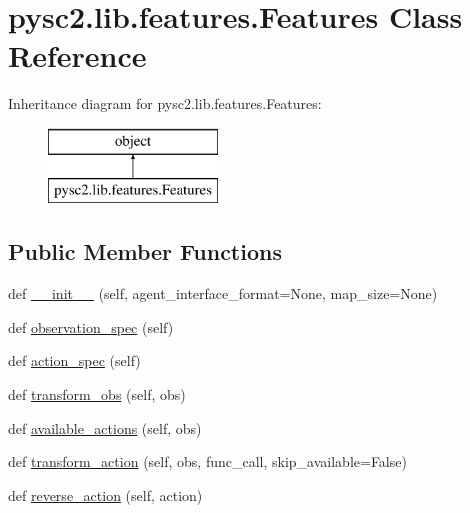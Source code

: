 \hypertarget{classpysc2_1_1lib_1_1features_1_1_features}{}\section{pysc2.\+lib.\+features.\+Features Class Reference}
\label{classpysc2_1_1lib_1_1features_1_1_features}
Inheritance diagram for pysc2.\+lib.\+features.\+Features\+:\begin{figure}[H]
\begin{center}
\leavevmode
\includegraphics[height=2.000000cm]{classpysc2_1_1lib_1_1features_1_1_features}
\end{center}
\end{figure}
\subsection*{Public Member Functions}
\begin{DoxyCompactItemize}
\item 
def \mbox{\hyperlink{classpysc2_1_1lib_1_1features_1_1_features_af12dfcaae0adbc89c662a44b8ce762de}{\+\_\+\+\_\+init\+\_\+\+\_\+}} (self, agent\+\_\+interface\+\_\+format=None, map\+\_\+size=None)
\item 
def \mbox{\hyperlink{classpysc2_1_1lib_1_1features_1_1_features_a4b1d691f5d9376c1116a6c81a927e865}{observation\+\_\+spec}} (self)
\item 
def \mbox{\hyperlink{classpysc2_1_1lib_1_1features_1_1_features_a76e3d8bfc6e588ee9dddbbb34015ca7d}{action\+\_\+spec}} (self)
\item 
def \mbox{\hyperlink{classpysc2_1_1lib_1_1features_1_1_features_a79fe09a0d35b8d7b6f761da2ddc72f67}{transform\+\_\+obs}} (self, obs)
\item 
def \mbox{\hyperlink{classpysc2_1_1lib_1_1features_1_1_features_ad5a0a4cc33805616b7219e81d5be3d03}{available\+\_\+actions}} (self, obs)
\item 
def \mbox{\hyperlink{classpysc2_1_1lib_1_1features_1_1_features_a4d30783f71487ebbf7ac3cf21873af65}{transform\+\_\+action}} (self, obs, func\+\_\+call, skip\+\_\+available=False)
\item 
def \mbox{\hyperlink{classpysc2_1_1lib_1_1features_1_1_features_ae50848a35cd3c31833d1eb37662611f3}{reverse\+\_\+action}} (self, action)
\end{DoxyCompactItemize}


